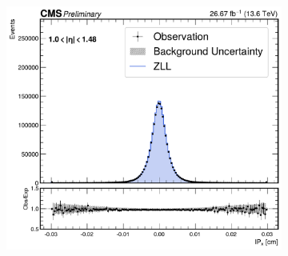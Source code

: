 \begin{figure}[!htbp]
\begin{subfigure}[b]{0.49\textwidth}
            \includegraphics[width=\textwidth]{Figures/Chapter7/IP_Corrections/After/ee/ip_x_1p0to1p48_comparison_with_ratio.pdf}
            \caption{}
        \end{subfigure}

        \vspace{0.5cm}


\end{figure}
